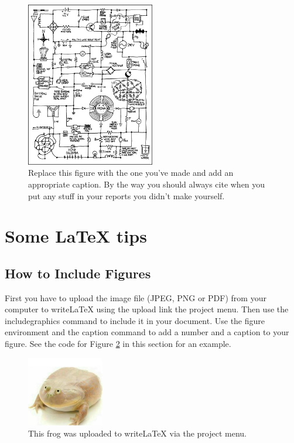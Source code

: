\documentclass[a4paper]{article}
\begin{document}
\begin{figure}
\centering
\includegraphics[width=0.5\textwidth]{circuit_diagram.png}
\caption{\label{fig:data}Replace this figure  \cite{xkcd} with the one you've made and add an appropriate caption. By the way you should always cite when you put any stuff in your reports you didn't make yourself.}
\end{figure}



\newpage
\section{Some LaTeX tips}
\label{sec:latex}
\subsection{How to Include Figures}

First you have to upload the image file (JPEG, PNG or PDF) from your computer to writeLaTeX using the upload link the project menu. Then use the includegraphics command to include it in your document. Use the figure environment and the caption command to add a number and a caption to your figure. See the code for Figure \ref{fig:frog} in this section for an example.

\begin{figure}
\centering
\includegraphics[width=0.3\textwidth]{frog.jpg}
\caption{\label{fig:frog}This frog was uploaded to writeLaTeX via the project menu.}
\end{figure}
\end{document}
